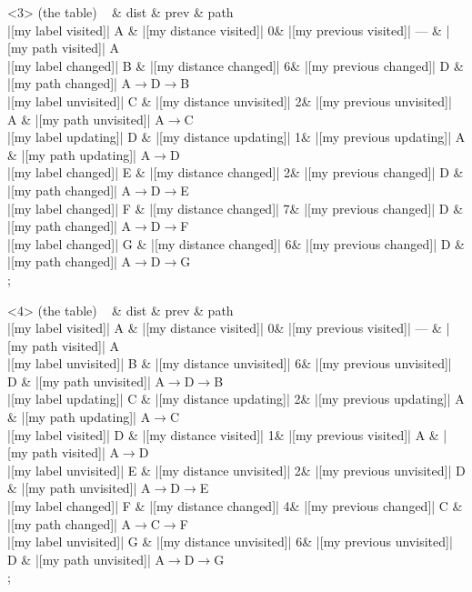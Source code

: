\begin{onlyenv}<3>
 (the table) {
~ \& dist \& prev \& path \\
|[my label visited]| A \& |[my distance visited]| 0\& |[my previous visited]| --- \& |[my path visited]| A\\
|[my label changed]| B \& |[my distance changed]| 6\& |[my previous changed]| D \& |[my path changed]| A$\rightarrow$D$\rightarrow$B\\
|[my label unvisited]| C \& |[my distance unvisited]| 2\& |[my previous unvisited]| A \& |[my path unvisited]| A$\rightarrow$C\\
|[my label updating]| D \& |[my distance updating]| 1\& |[my previous updating]| A \& |[my path updating]| A$\rightarrow$D\\
|[my label changed]| E \& |[my distance changed]| 2\& |[my previous changed]| D \& |[my path changed]| A$\rightarrow$D$\rightarrow$E\\
|[my label changed]| F \& |[my distance changed]| 7\& |[my previous changed]| D \& |[my path changed]| A$\rightarrow$D$\rightarrow$F\\
|[my label changed]| G \& |[my distance changed]| 6\& |[my previous changed]| D \& |[my path changed]| A$\rightarrow$D$\rightarrow$G\\
};
\end{onlyenv}
            
\begin{onlyenv}<4>
 (the table) {
~ \& dist \& prev \& path \\
|[my label visited]| A \& |[my distance visited]| 0\& |[my previous visited]| --- \& |[my path visited]| A\\
|[my label unvisited]| B \& |[my distance unvisited]| 6\& |[my previous unvisited]| D \& |[my path unvisited]| A$\rightarrow$D$\rightarrow$B\\
|[my label updating]| C \& |[my distance updating]| 2\& |[my previous updating]| A \& |[my path updating]| A$\rightarrow$C\\
|[my label visited]| D \& |[my distance visited]| 1\& |[my previous visited]| A \& |[my path visited]| A$\rightarrow$D\\
|[my label unvisited]| E \& |[my distance unvisited]| 2\& |[my previous unvisited]| D \& |[my path unvisited]| A$\rightarrow$D$\rightarrow$E\\
|[my label changed]| F \& |[my distance changed]| 4\& |[my previous changed]| C \& |[my path changed]| A$\rightarrow$C$\rightarrow$F\\
|[my label unvisited]| G \& |[my distance unvisited]| 6\& |[my previous unvisited]| D \& |[my path unvisited]| A$\rightarrow$D$\rightarrow$G\\
};
\end{onlyenv}
            

